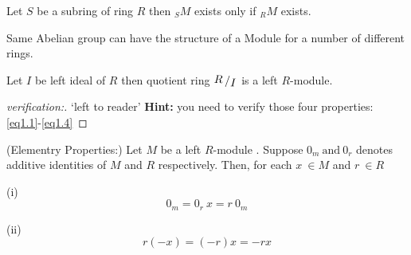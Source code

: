 \begin{remark}
	Let $S$ be a subring of ring $R$ then $_{S}M$ exists   only if $_{R}M$ exists.
\end{remark} \bigskip
\begin{remark}
	Same Abelian group can have the structure of a Module for a number of different rings.
\end{remark} \bigskip
\begin{remark}
Let $I$ be left ideal of $R$ then quotient ring $\bigslant{R}{I}$ is a left $R$-module.

\end{remark}
\begin{proof}[verification:]
	`left to reader'\newline \bigskip
	\textbf{Hint:} you need to verify those four properties: \eqref{eq1.1}-\eqref{eq1.4}
\end{proof}
\bigskip
\begin{thm}{(Elementry Properties:)}\newline
	Let $M$ be a left $R$-module . Suppose $0_m \ \text{and} \ 0_r$ denotes additive identities of $M$ and $R$ respectively. Then,  for each $x \ \in M$ and $r \ \in R$ \newline
\begin{description}
\item (i)
	\begin{equation*}
	0_m = 0_r\ x = r\ 0_m
	\end{equation*}
\item (ii)
	\begin{equation*}
	r(-x) =  (-r)x = -rx
	\end{equation*}
\end{description}
\end{thm}
